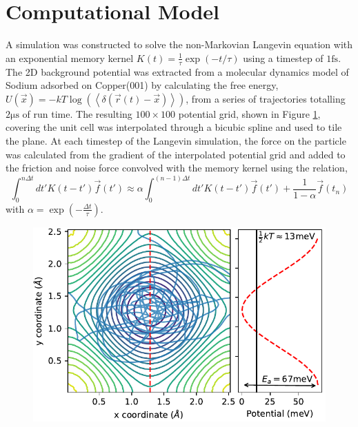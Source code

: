 \documentclass[7pt]{article}
\newcommand{\fs}{\si{\femto\second}}
\newcommand{\us}{\si{\micro\second}}
\begin{document}
\section{Computational Model}

A simulation was constructed to solve the non-Markovian Langevin equation with an exponential memory kernel $K(t)=\frac{1}{\tau}\exp(-t/\tau)$ using a timestep of $1\fs$. The 2D background potential was extracted from a molecular dynamics model of Sodium adsorbed on Copper(001) by calculating the free energy, $U(\vec{x}) = - kT \log(\left< \delta(\vec{r}(t)-\vec{x}) \right>)$, from a series of trajectories totalling $2 \us$ of run time. The resulting $100\times100$ potential grid, shown in Figure \ref{pot_surface},  covering the unit cell was interpolated through a bicubic spline\cite{press1992numerical} and used to tile the plane. At each timestep of the Langevin simulation, the force on the particle was calculated from the gradient of the interpolated potential grid and added to the friction and noise force convolved with the memory kernel using the relation,
$$
\int_0^{n\Delta{t}} dt' K\left(t-t'\right) \vec{f}(t') \approx \alpha \int_0^{(n-1)\Delta{t}} dt' K\left(t-t'\right) \vec{f}(t') + \frac{1}{1-\alpha} \vec{f}\left(t_n\right)
$$
with $\alpha=\exp(-\frac{\Delta{t}}{\tau})$.

\begin{figure}
	\centering
	\includegraphics{pot_surface}
	\caption{}
	\label{pot_surface}
\end{figure}


\end{document}
